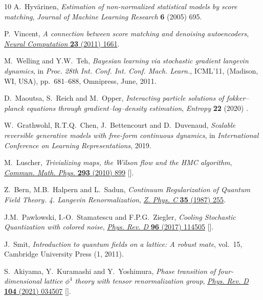 \begin{thebibliography}{10}
A.~Hyv{{\"a}}rinen, \emph{Estimation of non-normalized statistical models by
  score matching}, {\emph{Journal of Machine Learning Research} {\bfseries 6}
  (2005) 695}.

P.~Vincent, \emph{A connection between score matching and denoising
  autoencoders}, \href{https://doi.org/10.1162/NECO_a_00142}{\emph{Neural
  Computation} {\bfseries 23} (2011) 1661}.

M.~Welling and Y.W.~Teh, \emph{Bayesian learning via stochastic gradient
  langevin dynamics},  in \emph{Proc. 28th {{Int}}. {{Conf}}. {{Int}}.
  {{Conf}}. {{Mach}}. {{Learn}}.}, {{ICML}}'11, ({Madison, WI, USA}),
  pp.~681--688, {Omnipress}, June, 2011.

D.~Maoutsa, S.~Reich and M.~Opper, \emph{Interacting particle solutions of
  fokker–planck equations through gradient–log–density estimation},
  {\emph{Entropy} {\bfseries 22} (2020) }.

W.~Grathwohl, R.T.Q.~Chen, J.~Bettencourt and D.~Duvenaud, \emph{Scalable
  reversible generative models with free-form continuous dynamics},  in
  \emph{International Conference on Learning Representations}, 2019.

M.~Luscher, \emph{{Trivializing maps, the Wilson flow and the HMC algorithm}},
  \href{https://doi.org/10.1007/s00220-009-0953-7}{\emph{Commun. Math. Phys.}
  {\bfseries 293} (2010) 899}
  [\href{https://arxiv.org/abs/0907.5491}{{}}].

Z.~Bern, M.B.~Halpern and L.~Sadun, \emph{{Continuum Regularization of Quantum
  Field Theory. 4. Langevin Renormalization}},
  \href{https://doi.org/10.1007/BF01408455}{\emph{Z. Phys. C} {\bfseries 35}
  (1987) 255}.

J.M.~Pawlowski, I.-O.~Stamatescu and F.P.G.~Ziegler, \emph{{Cooling Stochastic
  Quantization with colored noise}},
  \href{https://doi.org/10.1103/PhysRevD.96.114505}{\emph{Phys. Rev. D}
  {\bfseries 96} (2017) 114505}
  [\href{https://arxiv.org/abs/1705.06231}{{}}].

J.~Smit, \emph{{Introduction to quantum fields on a lattice: A robust mate}},
  vol.~15, Cambridge University Press (1, 2011).

S.~Akiyama, Y.~Kuramashi and Y.~Yoshimura, \emph{{Phase transition of
  four-dimensional lattice ${\phi}^4$ theory with tensor renormalization
  group}}, \href{https://doi.org/10.1103/PhysRevD.104.034507}{\emph{Phys. Rev.
  D} {\bfseries 104} (2021) 034507}
  [\href{https://arxiv.org/abs/2101.06953}{{}}].


\end{thebibliography}
